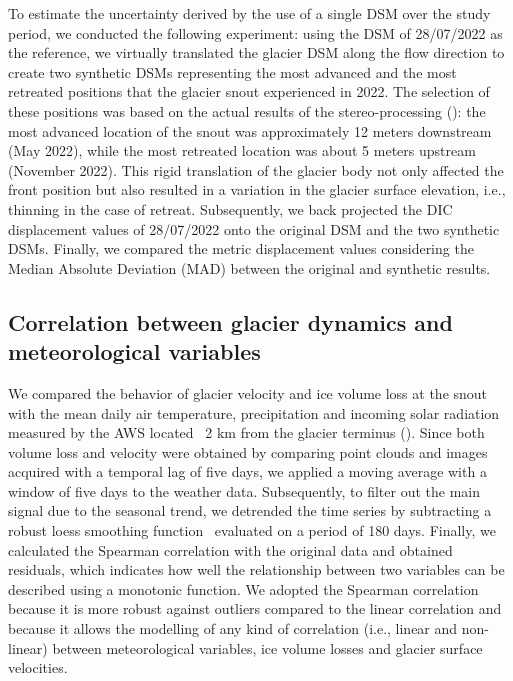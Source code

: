 To estimate the uncertainty derived by the use of a single DSM over the study period, we
conducted the following experiment: using the DSM of 28/07/2022 as the reference, we
virtually translated the glacier DSM along the flow direction to create two synthetic
DSMs representing the most advanced and the most retreated positions that the glacier
snout experienced in 2022.
The selection of these positions was based on the actual results of the stereo-processing
(): the most advanced location of the snout was
approximately 12 meters
downstream (May 2022), while the most retreated location was about 5 meters upstream
(November 2022). This rigid translation of the glacier body not only affected the front
position but also resulted in a variation in the glacier surface elevation, i.e.,
thinning in the case of retreat.
Subsequently, we back projected the DIC displacement values of 28/07/2022 onto the
original DSM and the two synthetic DSMs. Finally, we compared the metric displacement
values considering the Median Absolute Deviation (MAD) between the original and synthetic
results.

\subsection{Correlation between glacier dynamics and meteorological variables}
\label{sec:4:meteoanalysis}
We compared the behavior of glacier velocity and ice volume loss at the snout with the
mean daily air temperature, precipitation and incoming solar radiation measured by the
AWS located ~2 km from the glacier terminus ().
Since both volume loss and velocity were obtained by comparing point clouds and images
acquired with a temporal lag of five days, we applied a moving average with a window of
five days to the weather data. Subsequently, to filter out the main signal due to the
seasonal trend, we detrended the time series by subtracting a robust loess smoothing
function~\citep{Cleveland1979} evaluated on a period of 180 days.
Finally, we calculated the Spearman correlation with the original data and obtained
residuals, which indicates how well the relationship between two variables can be
described using a monotonic function.
We adopted the Spearman correlation because it is more robust against outliers compared
to the linear correlation and because it allows the modelling of any kind of correlation
(i.e., linear and non-linear) between meteorological variables, ice volume losses and
glacier surface velocities.


